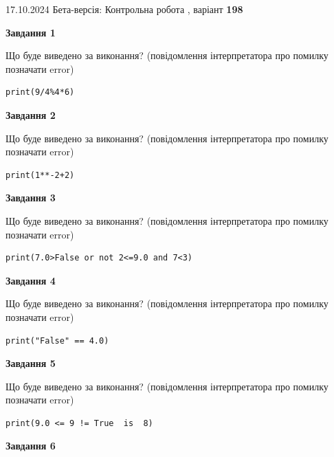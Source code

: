\documentclass[12pt, ukrainian]{article}
\begin{document}
{\Large{17.10.2024 Бета-версія: Контрольна робота , варіант  \No \textbf { 198 }\par}}
{
\begin {large}
{\begin {center}\textbf{Завдання 1}\end {center}}

Що буде виведено за виконання? (повідомлення інтерпретатора про помилку позначати error)\par
\begin{verbatim}
print(9/4%4*6)
\end{verbatim}

{\begin {center}\textbf{Завдання 2}\end {center}}

Що буде виведено за виконання? (повідомлення інтерпретатора про помилку позначати error)\par
\begin{verbatim}
print(1**-2+2)
\end{verbatim}

{\begin {center}\textbf{Завдання 3}\end {center}}

Що буде виведено за виконання? (повідомлення інтерпретатора про помилку позначати error)\par
\begin{verbatim}
print(7.0>False or not 2<=9.0 and 7<3)
\end{verbatim}

{\begin {center}\textbf{Завдання 4}\end {center}}

Що буде виведено за виконання? (повідомлення інтерпретатора про помилку позначати error)\par
\begin{verbatim}
print("False" == 4.0)
\end{verbatim}

{\begin {center}\textbf{Завдання 5}\end {center}}

Що буде виведено за виконання? (повідомлення інтерпретатора про помилку позначати error)\par
\begin{verbatim}
print(9.0 <= 9 != True  is  8)
\end{verbatim}

{\begin {center}\textbf{Завдання 6}\end {center}}


\end{large}}
\end{document}
